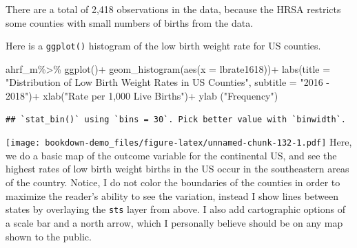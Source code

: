 \documentclass[
]{article}
\newenvironment{Shaded}{\begin{snugshade}}{\end{snugshade}}
\newcommand{\AttributeTok}[1]{\textcolor[rgb]{0.77,0.63,0.00}{#1}}
\newcommand{\FunctionTok}[1]{\textcolor[rgb]{0.00,0.00,0.00}{#1}}
\newcommand{\NormalTok}[1]{#1}
\newcommand{\SpecialCharTok}[1]{\textcolor[rgb]{0.00,0.00,0.00}{#1}}
\newcommand{\StringTok}[1]{\textcolor[rgb]{0.31,0.60,0.02}{#1}}
\begin{document}
There are a total of 2,418 observations in the data, because the HRSA restricts some counties with small numbers of births from the data.

Here is a \texttt{ggplot()} histogram of the low birth weight rate for US counties.

\begin{Shaded}
\begin{Highlighting}[]
\NormalTok{ahrf\_m}\SpecialCharTok{\%\textgreater{}\%}
  \FunctionTok{ggplot}\NormalTok{()}\SpecialCharTok{+}
  \FunctionTok{geom\_histogram}\NormalTok{(}\FunctionTok{aes}\NormalTok{(}\AttributeTok{x =}\NormalTok{ lbrate1618))}\SpecialCharTok{+}
  \FunctionTok{labs}\NormalTok{(}\AttributeTok{title =} \StringTok{"Distribution of Low Birth Weight Rates in US Counties"}\NormalTok{,}
       \AttributeTok{subtitle =} \StringTok{"2016 {-} 2018"}\NormalTok{)}\SpecialCharTok{+}
       \FunctionTok{xlab}\NormalTok{(}\StringTok{"Rate per 1,000 Live Births"}\NormalTok{)}\SpecialCharTok{+}
  \FunctionTok{ylab}\NormalTok{ (}\StringTok{"Frequency"}\NormalTok{)}
\end{Highlighting}
\end{Shaded}

\begin{verbatim}
## `stat_bin()` using `bins = 30`. Pick better value with `binwidth`.
\end{verbatim}

\texttt{[image: bookdown-demo\_files/figure-latex/unnamed-chunk-132-1.pdf]}
Here, we do a basic map of the outcome variable for the continental US, and see the highest rates of low birth weight births in the US occur in the southeastern areas of the country. Notice, I do not color the boundaries of the counties in order to maximize the reader's ability to see the variation, instead I show lines between states by overlaying the \texttt{sts} layer from above. I also add cartographic options of a scale bar and a north arrow, which I personally believe should be on any map shown to the public.
\end{document}
